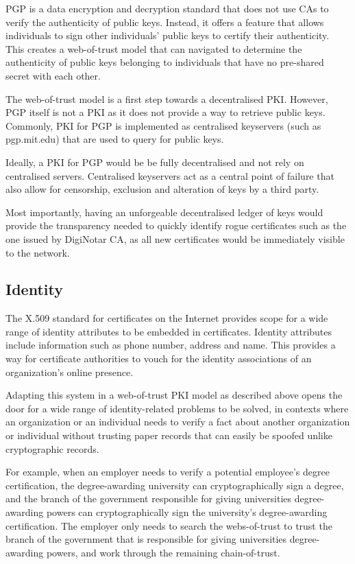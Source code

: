 \documentclass[12pt]{report}
\begin{document}
	PGP is a data encryption and decryption standard that does not use CAs to verify the authenticity of public keys. Instead, it offers a feature that allows individuals to sign other individuals' public keys to certify their authenticity. This creates a web-of-trust model that can navigated to determine the authenticity of public keys belonging to individuals that have no pre-shared secret with each other.\cite{2}

	The web-of-trust model is a first step towards a decentralised PKI. However, PGP itself is not a PKI as it does not provide a way to retrieve public keys. Commonly, PKI for PGP is implemented as centralised keyservers (such as pgp.mit.edu) that are used to query for public keys.

	Ideally, a PKI for PGP would be be fully decentralised and not rely on centralised servers. Centralised keyservers act as a central point of failure that also allow for censorship, exclusion and alteration of keys by a third party.
	
	Most importantly, having an unforgeable decentralised ledger of keys would provide the transparency needed to quickly identify rogue certificates such as the one issued by DigiNotar CA, as all new certificates would be immediately visible to the network.
	
	\subsection{Identity}
	The X.509 standard for certificates on the Internet provides scope for a wide range of identity attributes to be embedded in certificates.\cite{8} Identity attributes include information such as phone number, address and name. This provides a way for certificate authorities to vouch for the identity associations of an organization's online presence.
	
	Adapting this system in a web-of-trust PKI model as described above opens the door for a wide range of identity-related problems to be solved, in contexts where an organization or an individual needs to verify a fact about another organization or individual without trusting paper records that can easily be spoofed unlike cryptographic records.
	
	For example, when an employer needs to verify a potential employee's degree certification, the degree-awarding university can cryptographically sign a degree, and the branch of the government responsible for giving universities degree-awarding powers can cryptographically sign the university's degree-awarding certification. The employer only needs to search the webs-of-trust to trust the branch of the government that is responsible for giving universities degree-awarding powers, and work through the remaining chain-of-trust.
	
\end{document}
